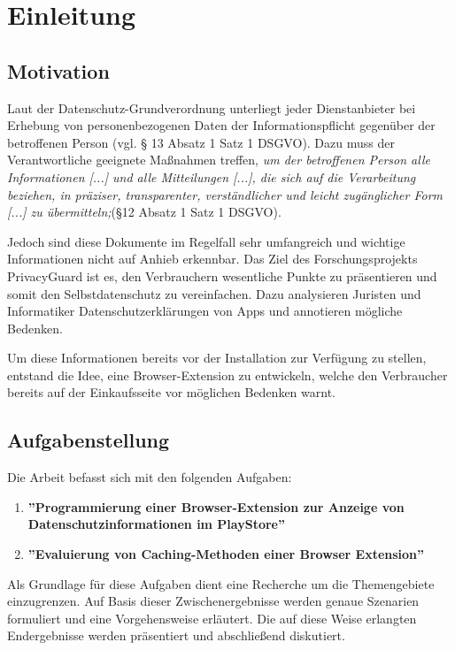 \chapter{Einleitung}
\label{c:einleitung}

\section{Motivation}
\label{s:motivation}
Laut der Datenschutz-Grundverordnung unterliegt jeder Dienstanbieter bei Erhebung von personenbezogenen Daten der Informationspflicht gegenüber der betroffenen Person (vgl. § 13 Absatz 1 Satz 1 DSGVO\cite{dsgvo13}). Dazu muss der Verantwortliche geeignete Maßnahmen treffen, \textit{\glqq um der betroffenen Person alle Informationen [...] und alle Mitteilungen [...], die sich auf die Verarbeitung beziehen, in präziser, transparenter, verständlicher und leicht zugänglicher Form [...] zu übermitteln;\grqq{}}(§12 Absatz 1 Satz 1 DSGVO\cite{dsgvo12}).

Jedoch sind diese Dokumente im Regelfall sehr umfangreich und wichtige Informationen nicht auf Anhieb erkennbar. Das Ziel des Forschungsprojekts \glqq PrivacyGuard \grqq{} ist es, den Verbrauchern wesentliche Punkte zu präsentieren und somit den Selbstdatenschutz zu vereinfachen. Dazu analysieren Juristen und Informatiker Datenschutzerklärungen von Apps und annotieren mögliche Bedenken. 

Um diese Informationen bereits vor der Installation zur Verfügung zu stellen, entstand die Idee, eine Browser-Extension zu entwickeln, welche den Verbraucher bereits auf der Einkaufsseite vor möglichen Bedenken warnt.

\section{Aufgabenstellung}
\label{s:aufgabenstellung}

Die Arbeit befasst sich mit den folgenden Aufgaben:
\begin{enumerate}
	\item \textbf{''Programmierung einer Browser-Extension zur Anzeige von Datenschutzinformationen im PlayStore''}
	\item \textbf{''Evaluierung von Caching-Methoden einer Browser Extension''}
\end{enumerate}

Als Grundlage für diese Aufgaben dient eine Recherche um die Themengebiete einzugrenzen. Auf Basis dieser Zwischenergebnisse werden genaue Szenarien formuliert und eine Vorgehensweise erläutert. Die auf diese Weise erlangten Endergebnisse werden präsentiert und abschließend diskutiert.

